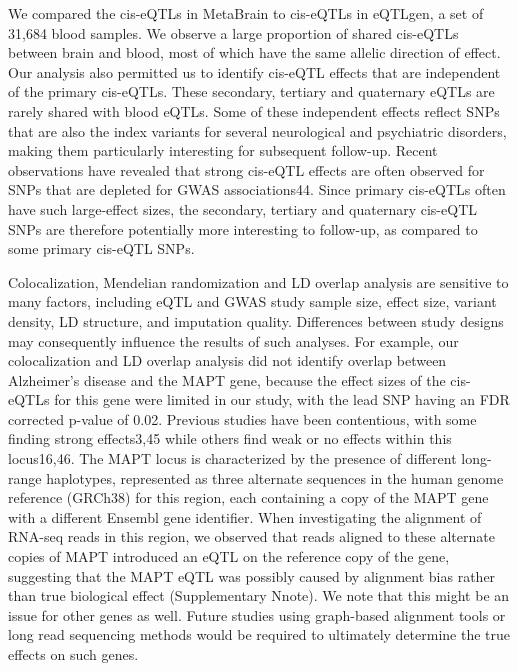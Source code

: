 We compared the cis-eQTLs in MetaBrain to cis-eQTLs in eQTLgen, a set of 31,684 blood samples. We observe a large proportion of shared cis-eQTLs between brain and blood, most of which have the same allelic direction of effect. Our analysis also permitted us to identify cis-eQTL effects that are independent of the primary cis-eQTLs. These secondary, tertiary and quaternary eQTLs are rarely shared with blood eQTLs. Some of these independent effects reflect SNPs that are also the index variants for several neurological and psychiatric disorders, making them particularly interesting for subsequent follow-up. Recent observations have revealed that strong cis-eQTL effects are often observed for SNPs that are depleted for GWAS associations44. Since primary cis-eQTLs often have such large-effect sizes, the secondary, tertiary and quaternary cis-eQTL SNPs are therefore potentially more interesting to follow-up, as compared to some primary cis-eQTL SNPs. 



Colocalization, Mendelian randomization and LD overlap analysis are sensitive to many factors, including eQTL and GWAS study sample size, effect size, variant density, LD structure, and imputation quality. Differences between study designs may consequently influence the results of such analyses. For example, our colocalization and LD overlap analysis did not identify overlap between Alzheimer’s disease and the MAPT gene, because the effect sizes of the cis-eQTLs for this gene were limited in our study, with the lead SNP having an FDR corrected p-value of 0.02. Previous studies have been contentious, with some finding strong effects3,45 while others find weak or no effects within this locus16,46. The MAPT locus is characterized by the presence of different long-range haplotypes, represented as three alternate sequences in the human genome reference (GRCh38) for this region, each containing a copy of the MAPT gene with a different Ensembl gene identifier. When investigating the alignment of RNA-seq reads in this region, we observed that reads aligned to these alternate copies of MAPT introduced an eQTL on the reference copy of the gene, suggesting that the MAPT eQTL was possibly caused by alignment bias rather than true biological effect (Supplementary Nnote). We note that this might be an issue for other genes as well. Future studies using graph-based alignment tools or long read sequencing methods would be required to ultimately determine the true effects on such genes. 



